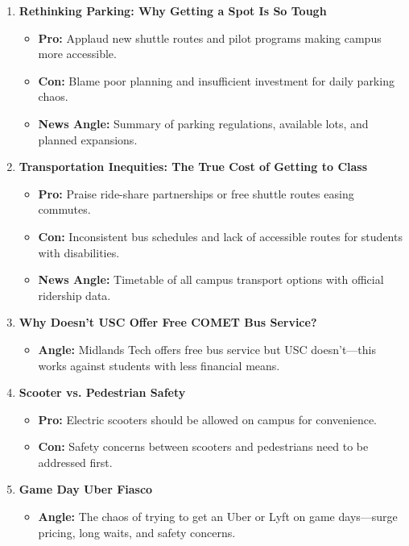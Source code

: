 \documentclass{article}
\begin{document}
\begin{enumerate}[leftmargin=*]
    \item \textbf{Rethinking Parking: Why Getting a Spot Is So Tough}
    \begin{itemize}
        \item \textbf{Pro:} Applaud new shuttle routes and pilot programs making campus more accessible.
        \item \textbf{Con:} Blame poor planning and insufficient investment for daily parking chaos.
        \item \textbf{News Angle:} Summary of parking regulations, available lots, and planned expansions.
    \end{itemize}

    \item \textbf{Transportation Inequities: The True Cost of Getting to Class}
    \begin{itemize}
        \item \textbf{Pro:} Praise ride-share partnerships or free shuttle routes easing commutes.
        \item \textbf{Con:} Inconsistent bus schedules and lack of accessible routes for students with disabilities.
        \item \textbf{News Angle:} Timetable of all campus transport options with official ridership data.
    \end{itemize}

    \item \textbf{Why Doesn't USC Offer Free COMET Bus Service?}
    \begin{itemize}
        \item \textbf{Angle:} Midlands Tech offers free bus service but USC doesn't---this works against students with less financial means.
    \end{itemize}

    \item \textbf{Scooter vs. Pedestrian Safety}
    \begin{itemize}
        \item \textbf{Pro:} Electric scooters should be allowed on campus for convenience.
        \item \textbf{Con:} Safety concerns between scooters and pedestrians need to be addressed first.
    \end{itemize}

    \item \textbf{Game Day Uber Fiasco}
    \begin{itemize}
        \item \textbf{Angle:} The chaos of trying to get an Uber or Lyft on game days---surge pricing, long waits, and safety concerns.
    \end{itemize}
\end{enumerate}
\end{document}
